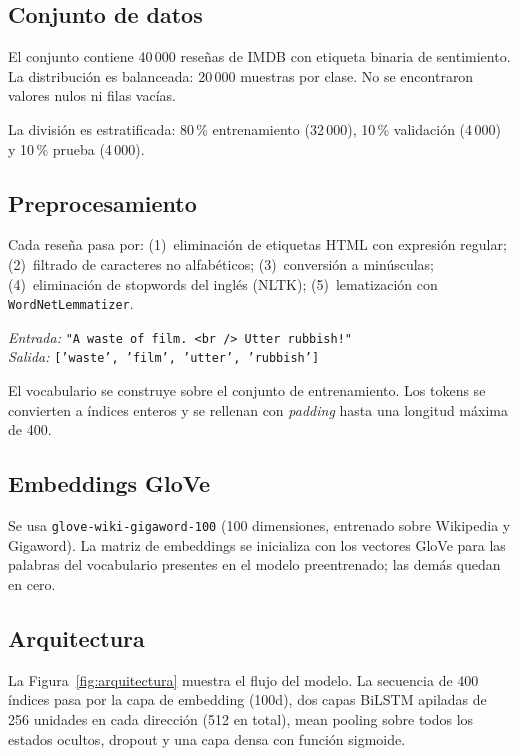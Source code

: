 \documentclass[letterpaper, 10 pt, conference]{ieeeconf}
\begin{document}
\subsection{Conjunto de datos}

El conjunto contiene 40\,000 rese\~nas de IMDB con etiqueta binaria de
sentimiento. La distribuci\'on es balanceada: 20\,000 muestras por clase.
No se encontraron valores nulos ni filas vac\'ias.

La divisi\'on es estratificada: 80\,\% entrenamiento (32\,000), 10\,\%
validaci\'on (4\,000) y 10\,\% prueba (4\,000).

\subsection{Preprocesamiento}

Cada rese\~na pasa por: (1)~eliminaci\'on de etiquetas HTML con expresi\'on
regular; (2)~filtrado de caracteres no alfabéticos; (3)~conversi\'on a
min\'usculas; (4)~eliminaci\'on de stopwords del ingl\'es (NLTK);
(5)~lematizaci\'on con \texttt{WordNetLemmatizer}.

\begin{center}
{\small
\textit{Entrada:} \texttt{"A waste of film.\,\textless br\,/\textgreater\,Utter rubbish!"}\\[2pt]
\textit{Salida:} \texttt{['waste', 'film', 'utter', 'rubbish']}
}
\end{center}

El vocabulario se construye sobre el conjunto de entrenamiento. Los tokens
se convierten a \'indices enteros y se rellenan con \textit{padding} hasta
una longitud m\'axima de 400.

\subsection{Embeddings GloVe}

Se usa \texttt{glove-wiki-gigaword-100} (100 dimensiones, entrenado sobre
Wikipedia y Gigaword). La matriz de embeddings se inicializa con los vectores
GloVe para las palabras del vocabulario presentes en el modelo preentrenado;
las dem\'as quedan en cero.

\subsection{Arquitectura}

La Figura~\ref{fig:arquitectura} muestra el flujo del modelo. La secuencia
de 400 \'indices pasa por la capa de embedding (100d), dos capas BiLSTM
apiladas de 256 unidades en cada direcci\'on (512 en total), mean pooling
sobre todos los estados ocultos, dropout y una capa densa con funci\'on
sigmoide.
\end{document}
